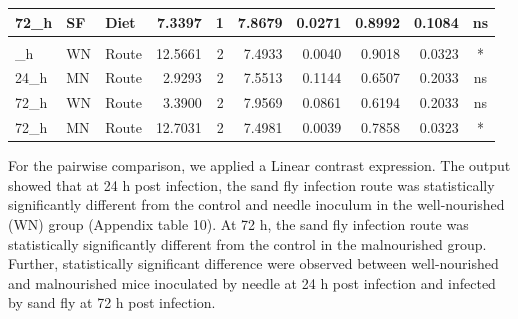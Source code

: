 \documentclass[
  12pt,
  letterpaper,
]{article}
\begin{document}
\begin{longtable}{lllrrrrrrc}
72\_h & SF & Diet & 7.3397 & 1 & 7.8679 & 0.0271 & 0.8992 & 0.1084 & ns \\ 
\midrule\addlinespace[2.5pt]
\multicolumn{10}{l}{Predictor: Route} \\[2.5pt] 
\midrule\addlinespace[2.5pt]
24\_h & WN & Route & 12.5661 & 2 & 7.4933 & 0.0040 & 0.9018 & 0.0323 & * \\ 
24\_h & MN & Route & 2.9293 & 2 & 7.5513 & 0.1144 & 0.6507 & 0.2033 & ns \\ 
72\_h & WN & Route & 3.3900 & 2 & 7.9569 & 0.0861 & 0.6194 & 0.2033 & ns \\ 
72\_h & MN & Route & 12.7031 & 2 & 7.4981 & 0.0039 & 0.7858 & 0.0323 & * \\ 
\bottomrule
\end{longtable}
\endgroup

For the pairwise comparison, we applied a Linear contrast expression. The output showed that at 24 h post infection, the sand fly infection route was statistically significantly different from the control and needle inoculum in the well-nourished (WN) group (Appendix table 10). At 72 h, the sand fly infection route was statistically significantly different from the control in the malnourished group. Further, statistically significant difference were observed between well-nourished and malnourished mice inoculated by needle at 24 h post infection and infected by sand fly at 72 h post infection.
\end{document}
